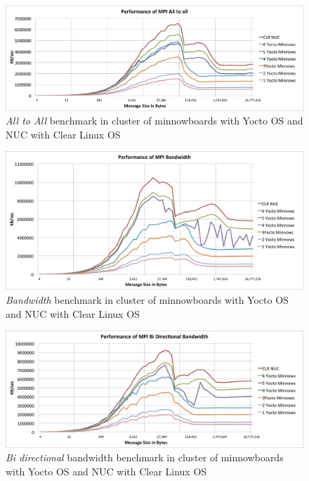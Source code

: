 \begin{figure}[H]
\centering
\includegraphics[width=1.0\textwidth]{images/mpbench_cluster_experiments/mpi_alltoall.png}
\caption{\textit{All to All} benchmark in cluster of minnowboards with Yocto OS and NUC
with Clear Linux OS}
\label{all_to_all_cluster}
\end{figure}


\begin{figure}[H]
\centering
\includegraphics[width=1.0\textwidth]{images/mpbench_cluster_experiments/mpi_bandwidth.png}
\caption{\textit{Bandwidth} benchmark in cluster of minnowboards with Yocto OS and NUC
with Clear Linux OS}
\label{all_to_all_cluster}
\end{figure}

\begin{figure}[H]
\centering
\includegraphics[width=1.0\textwidth]{images/mpbench_cluster_experiments/mpi_bibw.png}
\caption{\textit{Bi directional} bandwidth benchmark in cluster of minnowboards with Yocto OS and NUC
with Clear Linux OS}
\label{all_to_all_cluster}
\end{figure}


